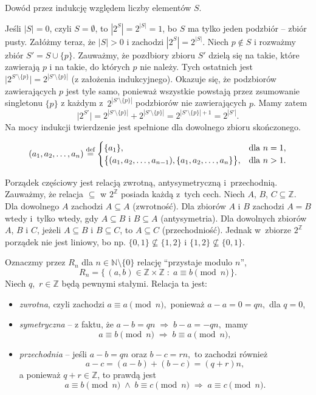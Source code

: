 \exercise{} %
Dowód przez indukcję względem liczby elementów $S$.

Jeśli $|S|=0$, czyli $S=\emptyset$, to $|2^S|=2^{|S|}=1$, bo $S$ ma tylko jeden podzbiór -- zbiór pusty. Załóżmy teraz, że $|S|>0$ i zachodzi $|2^S|=2^{|S|}$. Niech $p\not\in S$ i rozważmy zbiór $S'=S\cup\{p\}$. Zauważmy, że pozdbiory zbioru $S'$ dzielą się na takie, które zawierają $p$ i na takie, do których $p$ nie należy. Tych ostatnich jest $\bigl|2^{S'\setminus\{p\}}\bigr|=2^{\left|S'\setminus\{p\}\right|}$ (z założenia indukcyjnego). Okazuje się, że podzbiorów zawierających $p$ jest tyle samo, ponieważ wszystkie powstają przez zsumowanie singletonu $\{p\}$ z każdym z~$2^{\left|S'\setminus\{p\}\right|}$ podzbiorów nie zawierających $p$. Mamy zatem
\[
	\bigl|2^{S'}\bigr|=2^{\left|S'\setminus\{p\}\right|}+2^{\left|S'\setminus\{p\}\right|} = 2^{\left|S'\setminus\{p\}\right|+1} = 2^{|S'|}.
\]
Na mocy indukcji twierdzenie jest spełnione dla dowolnego zbioru skończonego.

\exercise{} %
\[
	(a_1,a_2,\dots,a_n)\stackrel{\text{\scriptsize def}}{=}
	\begin{cases}
		\{a_1\}, & \text{dla $n=1$}, \\
		\bigl\{(a_1,a_2,\dots,a_{n-1}),\{a_1,a_2,\dots,a_n\}\bigr\}, & \text{dla $n>1$}.
	\end{cases}
\]


\exercise{} %
Porządek częściowy jest relacją zwrotną, antysymetryczną i~przechodnią. Zauważmy, że relacja $\subseteq$ w $2^\mathbb{Z}$ posiada każdą z~tych cech. Niech $A$, $B$, $C\subseteq\mathbb{Z}$. Dla dowolnego $A$ zachodzi $A\subseteq A$ (zwrotność). Dla zbiorów $A$ i $B$ zachodzi $A=B$ wtedy i~tylko wtedy, gdy $A\subseteq B$ i $B\subseteq A$ (antysymetria). Dla dowolnych zbiorów $A$, $B$ i $C$, jeżeli $A\subseteq B$ i $B\subseteq C$, to $A\subseteq C$ (przechodniość). Jednak w~zbiorze $2^\mathbb{Z}$ porządek nie jest liniowy, bo np. $\{0,1\}\not\subseteq\{1,2\}$ i $\{1,2\}\not\subseteq\{0,1\}$.

\exercise{} %
Oznaczmy przez $R_n$ dla $n\in\mathbb{N}\setminus\{0\}$ relację ``przystaje modulo $n$'',
\[
	R_n = \bigl\{\,(a,b)\in\mathbb{Z}\times\mathbb{Z}\;:\;a\equiv b\!\!\!\pmod{n}\,\bigr\}.
\]
Niech $q$,~$r\in\mathbb{Z}$ będą pewnymi stałymi. Relacja ta jest:
\begin{itemize}
	\item \emph{zwrotna}, czyli zachodzi $a\equiv a\pmod{n},$ ponieważ $a-a=0=qn,$ dla $q=0$,
	\item \emph{symetryczna} -- z faktu, że $a-b=qn\;\Rightarrow\;b-a=-qn,$ mamy
	\[
		a\equiv b\!\!\!\pmod{n}\;\Rightarrow\;b\equiv a\!\!\!\pmod{n},
	\]
	\item \emph{przechodnia} -- jeśli $a-b=qn$ oraz $b-c=rn,$ to zachodzi również
	\[
		a-c=(a-b)+(b-c)=(q+r)n,
	\]
	a ponieważ $q+r\in\mathbb{Z}$, to prawdą jest
	\[
		a\equiv b\!\!\!\pmod{n}\;\wedge\;b\equiv c\!\!\!\pmod{n}\;\Rightarrow\;a\equiv c\!\!\!\pmod{n}.
	\]
\end{itemize}

